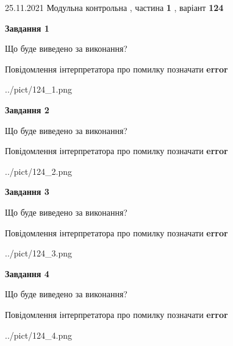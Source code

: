 \documentclass[10pt, ukrainian]{article}
\begin{document}
{25.11.2021 Модульна контрольна , частина \textbf { 1 }, варіант  \No \textbf { 124 }\par}
{
\begin {large}

{\begin {center}\textbf{Завдання 1}\end {center}}\par
Що буде виведено за виконання? \par
Повідомлення інтерпретатора про помилку позначати \textbf{error}

\begin{center}
	{../pict/124_1.png}
\end{center}
\newpage

{\begin {center}\textbf{Завдання 2}\end {center}}\par
Що буде виведено за виконання? \par
Повідомлення інтерпретатора про помилку позначати \textbf{error}

\begin{center}
	{../pict/124_2.png}
\end{center}
\newpage

{\begin {center}\textbf{Завдання 3}\end {center}}\par
Що буде виведено за виконання? \par
Повідомлення інтерпретатора про помилку позначати \textbf{error}

\begin{center}
	{../pict/124_3.png}
\end{center}
\newpage

{\begin {center}\textbf{Завдання 4}\end {center}}\par
Що буде виведено за виконання? \par
Повідомлення інтерпретатора про помилку позначати \textbf{error}

\begin{center}
	{../pict/124_4.png}
\end{center}
\newpage


\end{large}}
\end{document}
